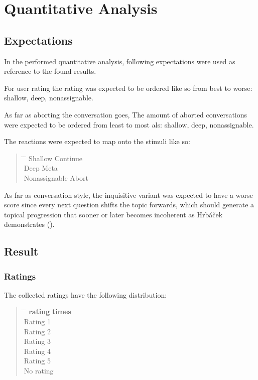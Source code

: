 \chapter{Quantitative Analysis}

\section{Expectations}

In the performed quantitative analysis,
following expectations were used as reference to the found results.

For user rating the rating was expected to be ordered like so from best to worse:
shallow, deep, nonassignable.

As far as aborting the conversation goes,
The amount of aborted conversations were expected to be ordered
from least to most als:
shallow, deep, nonassignable.

The reactions were expected to map onto the stimuli like so:

\begin{quote}
\begin{tabbing}
\hspace{4cm} \= \hspace{4cm} \= \kill %
Shallow \> Continue \\
Deep \> Meta \\
Nonassignable \> Abort \\
\end{tabbing}
\end{quote}

As far as conversation style, the inquisitive variant was expected to have a worse score
since every next question shifts the topic forwards, which should generate a topical progression
that sooner or later becomes incoherent as Hrbáček demonstrates ().

\section{Result}

\subsection{Ratings}

The collected ratings have the following distribution:

\begin{quote}
\begin{tabbing}
\hspace{4cm} \= \hspace{4cm} \= \kill %
\textbf{rating} \> \textbf{times} \\
Rating 1  \\
Rating 2  \\
Rating 3  \\
Rating 4  \\
Rating 5  \\
No rating  \\
\end{tabbing}
\end{quote}

